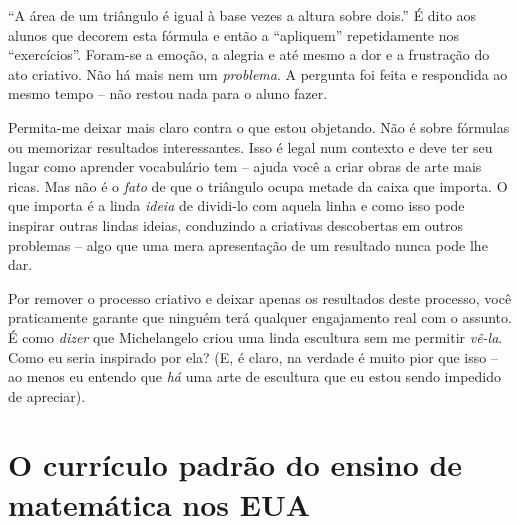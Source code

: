 \documentclass[a4paper,oneside,12pt,notitlepage]{article}
\begin{document}
\vspace{1em}

``A área de um triângulo é igual à base vezes a altura sobre dois.''
É dito aos alunos que decorem esta fórmula e então a ``apliquem'' repetidamente nos ``exercícios''.
Foram-se a emoção, a alegria e até mesmo a dor e a frustração do ato criativo.
Não há mais nem um \textsl{problema}.
A pergunta foi feita e respondida ao mesmo tempo -- não restou nada para o aluno fazer.

Permita-me deixar mais claro contra o que estou objetando.
Não é sobre fórmulas ou memorizar resultados interessantes.
Isso é legal num contexto e deve ter seu lugar como aprender vocabulário tem -- ajuda você a criar obras de arte mais ricas.
Mas não é o \textsl{fato} de que o triângulo ocupa metade da caixa que importa.
O que importa é a linda \textsl{ideia} de dividi-lo com aquela linha e como isso pode inspirar outras lindas ideias, conduzindo a criativas descobertas em outros problemas -- algo que uma mera apresentação de um resultado nunca pode lhe dar.

Por remover o processo criativo e deixar apenas os resultados deste processo, você praticamente garante que ninguém terá qualquer engajamento real com o assunto.
É como \textsl{dizer} que Michelangelo criou uma linda escultura sem me permitir \textsl{vê-la}.
Como eu seria inspirado por ela?
(E, é claro, na verdade é muito pior que isso -- ao menos eu entendo que \textsl{há} uma arte de escultura que eu estou sendo impedido de apreciar).










\section*{O currículo padrão do ensino de matemática nos EUA}
\end{document}
